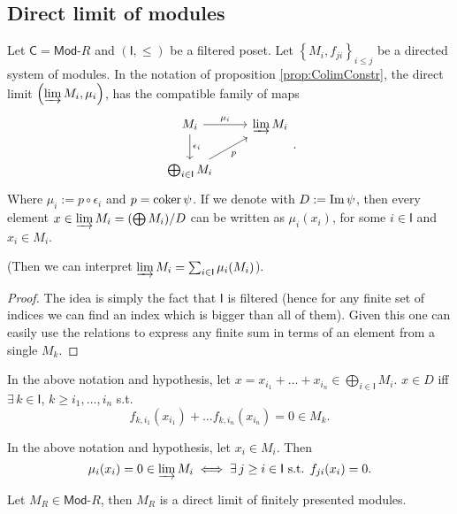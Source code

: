 \subsection{Direct limit of modules}
\begin{lem}
	Let $\mathsf{C} = \mathsf{Mod}\text{-}R$ and $\left(\mathsf{I}, \leq\right)$ be a filtered poset.
	Let $\left\{ M_i, f_{ji} \right\}_{i \leq j}$ be a directed system of modules.
	In the notation of proposition \ref{prop:ColimConstr}, the direct limit $\left(\varinjlim M_i, \mu_i\right)$, has the
	compatible family of maps
	\begin{equation}
	\begin{tikzcd}
		M_i \arrow[r, "\mu_i", rightarrow] \arrow[d, "\epsilon_i", rightarrow] &
		\varinjlim M_i \\
		\bigoplus_{i \in \mathsf{I}} M_i \arrow[ru, "p"', rightarrow] &
	\end{tikzcd}
	.\end{equation} 
	Where $\mu_i := p \circ\epsilon_i$ and $p = \operatorname{coker} \psi$.
	If we denote with $D := \operatorname{Im} \psi$, then
	every element $x \in \varinjlim M_i = (\bigoplus M_i)/D$ can be written as
	$\mu_i(x_i)$, for some $i \in \mathsf{I}$ and $x_i \in M_i$.

	(Then we can interpret $\varinjlim M_i = \sum_{i \in \mathsf{I}}^{} \mu_i (M_i)$).
\end{lem} 
\begin{proof}
	The idea is simply the fact that $\mathsf{I}$ is filtered 
	(hence for any finite set of indices we can find an index which is bigger than all of them).
	Given this one can easily use the relations to express any finite sum in terms of an element from a single $M_k$.
\end{proof}

\begin{lem}
	In the above notation and hypothesis, let $x = x_{i_1} + \ldots + x_{i_n} \in \bigoplus_{i \in \mathsf{I}} M_i$.
	$x \in D$ iff $\exists\, k \in \mathsf{I}$, $k \geq i_1, \ldots, i_n$ s.t.
	\begin{equation}
		f_{k, i_1}(x_{i_1}) + \ldots f_{k, i_n}(x_{i_n}) = 0 \in M_k
	.\end{equation} 
\end{lem} 

\begin{lem}
	In the above notation and hypothesis, let $x_i \in M_i$.
	Then 
	\begin{equation}
		\mu_i(x_i) = 0 \in \varinjlim M_i \iff \exists\, j \geq i \in \mathsf{I} \text{ s.t. } f_{ji}(x_i) = 0
	.\end{equation} 
\end{lem} 

\begin{prop}
	Let $M_R \in \mathsf{Mod}\text{-}R$, then $M_R$ is a direct limit of finitely presented modules.
\end{prop} 
